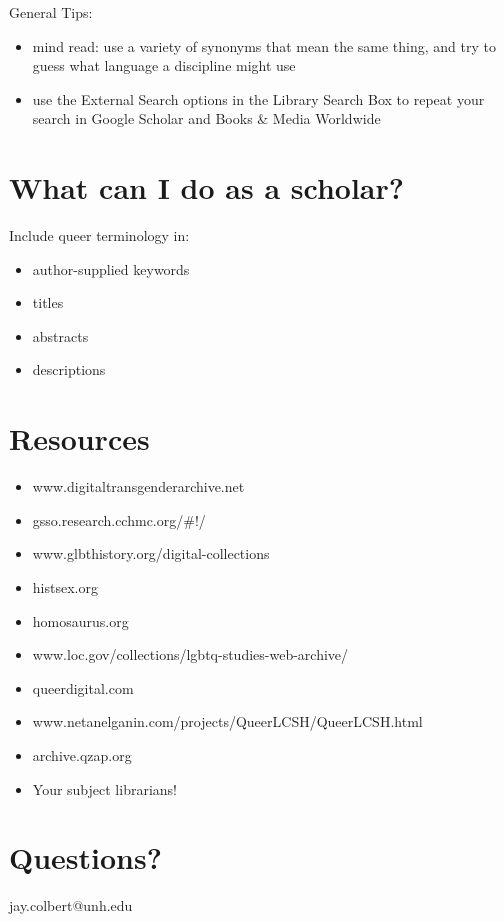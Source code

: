 \documentclass[11pt]{article}
\begin{document}
General Tips:

\begin{itemize}
\item mind read: use a variety of synonyms that mean the same thing, and try to guess what language a discipline might use
\item use the External Search options in the Library Search Box to repeat your search in Google Scholar and Books \& Media Worldwide
\end{itemize}


\section*{What can I do as a scholar?}
\label{sec:org9ee3db2}

Include queer terminology in:

\begin{itemize}
\item author-supplied keywords
\item titles
\item abstracts
\item descriptions
\end{itemize}

\section*{Resources}
\label{sec:orgb9aa760}

\begin{itemize}
\item www.digitaltransgenderarchive.net
\item gsso.research.cchmc.org/\#!/
\item www.glbthistory.org/digital-collections
\item histsex.org
\item homosaurus.org
\item www.loc.gov/collections/lgbtq-studies-web-archive/
\item queerdigital.com
\item www.netanelganin.com/projects/QueerLCSH/QueerLCSH.html
\item archive.qzap.org
\item Your subject librarians!
\end{itemize}

\section*{Questions?}
\label{sec:org02bd9e0}

jay.colbert@unh.edu
\end{document}
